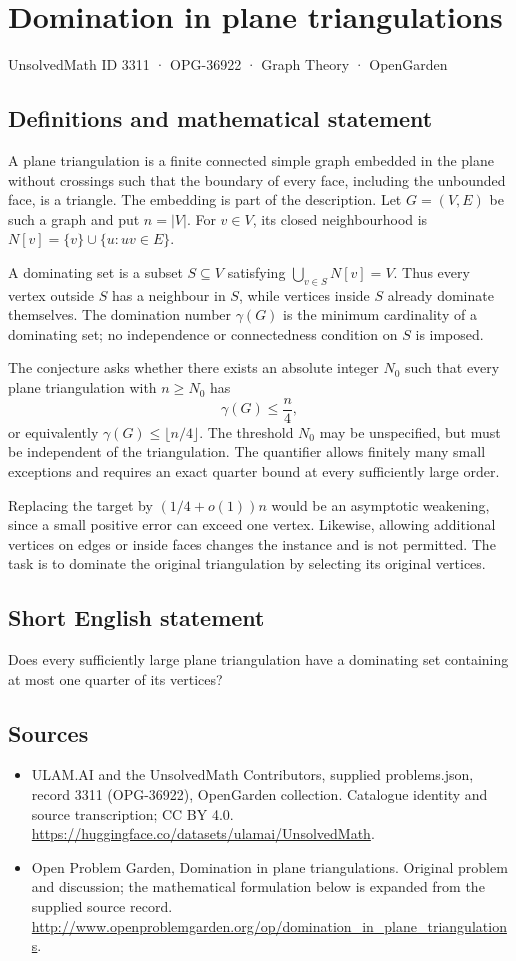 \documentclass[11pt,a4paper]{article}
\begin{document}
\section*{Domination in plane triangulations}\label{3311}
{\small UnsolvedMath ID 3311 · OPG-36922 · Graph Theory · OpenGarden}
\subsection{Definitions and mathematical statement}
A plane triangulation is a finite connected simple graph embedded in
the plane without crossings such that the boundary of every face,
including the unbounded face, is a triangle. The embedding is part
of the description. Let $G=(V,E)$ be such a graph and put $n=|V|$.
For $v\in V$, its closed neighbourhood is
$N[v]=\{v\}\cup\{u:uv\in E\}$.

A dominating set is a subset $S\subseteq V$ satisfying
$\bigcup_{v\in S}N[v]=V$. Thus every vertex outside $S$ has a neighbour
in $S$, while vertices inside $S$ already dominate themselves.
The domination number $\gamma(G)$ is the minimum cardinality of a
dominating set; no independence or connectedness condition on $S$
is imposed.

The conjecture asks whether there exists an absolute integer $N_0$
such that every plane triangulation with $n\ge N_0$ has
\[
                             \gamma(G)\le\frac n4,
\]
or equivalently $\gamma(G)\le\lfloor n/4\rfloor$. The threshold $N_0$
may be unspecified, but must be independent of the triangulation.
The quantifier allows finitely many small exceptions and requires an
exact quarter bound at every sufficiently large order.

Replacing the target by $(1/4+o(1))n$ would be an asymptotic weakening,
since a small positive error can exceed one vertex. Likewise,
allowing additional vertices on edges or inside faces changes the
instance and is not permitted. The task is to dominate the original
triangulation by selecting its original vertices.
\subsection{Short English statement}
Does every sufficiently large plane triangulation have a dominating set containing at most one quarter of its vertices?
\subsection{Sources}
\begin{itemize}
\item[S1] ULAM.AI and the UnsolvedMath Contributors, supplied problems.json, record 3311 (OPG-36922), OpenGarden collection. Catalogue identity and source transcription; CC BY 4.0.
\url{https://huggingface.co/datasets/ulamai/UnsolvedMath}.
\item[S2] Open Problem Garden, Domination in plane triangulations. Original problem and discussion; the mathematical formulation below is expanded from the supplied source record.
\url{http://www.openproblemgarden.org/op/domination_in_plane_triangulations}.
\end{itemize}
\end{document}
